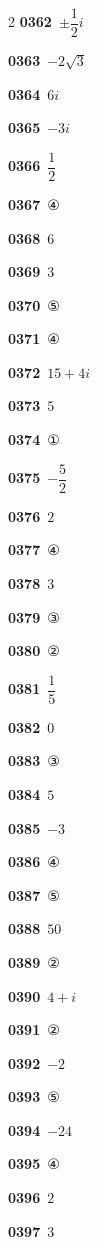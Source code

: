 \documentclass[10pt,a4paper]{article}
\begin{document}
\begin{multicols}{2}
\noindent\textbf{0362}\ $\pm\dfrac{1}{2}i$\par
\noindent\textbf{0363}\ $-2\sqrt{3}$\par
\noindent\textbf{0364}\ $6i$\par
\noindent\textbf{0365}\ $-3i$\par
\noindent\textbf{0366}\ $\dfrac{1}{2}$\par
\noindent\textbf{0367}\ ④\par
\noindent\textbf{0368}\ $6$\par
\noindent\textbf{0369}\ $3$\par
\noindent\textbf{0370}\ ⑤\par
\noindent\textbf{0371}\ ④\par
\noindent\textbf{0372}\ $15+4i$\par
\noindent\textbf{0373}\ $5$\par
\noindent\textbf{0374}\ ①\par
\noindent\textbf{0375}\ $-\dfrac{5}{2}$\par
\noindent\textbf{0376}\ $2$\par
\noindent\textbf{0377}\ ④\par
\noindent\textbf{0378}\ $3$\par
\noindent\textbf{0379}\ ③\par
\noindent\textbf{0380}\ ②\par
\noindent\textbf{0381}\ $\dfrac{1}{5}$\par
\noindent\textbf{0382}\ $0$\par
\noindent\textbf{0383}\ ③\par
\noindent\textbf{0384}\ $5$\par
\noindent\textbf{0385}\ $-3$\par
\noindent\textbf{0386}\ ④\par
\noindent\textbf{0387}\ ⑤\par
\noindent\textbf{0388}\ $50$\par
\noindent\textbf{0389}\ ②\par
\noindent\textbf{0390}\ $4+i$\par
\noindent\textbf{0391}\ ②\par
\noindent\textbf{0392}\ $-2$\par
\noindent\textbf{0393}\ ⑤\par
\noindent\textbf{0394}\ $-24$\par
\noindent\textbf{0395}\ ④\par
\noindent\textbf{0396}\ $2$\par
\noindent\textbf{0397}\ $3$\par

\end{multicols}
\end{document}
